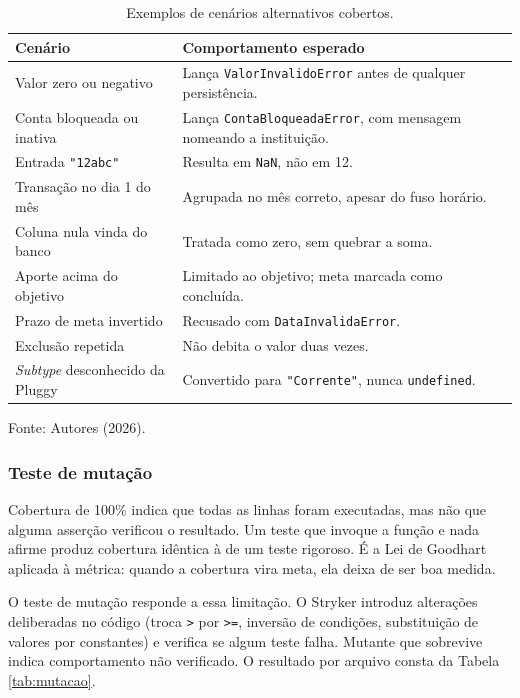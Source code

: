 \documentclass[12pt,a4paper]{article}
\begin{document}
\begin{table}[H]
\centering
\caption{Exemplos de cenários alternativos cobertos.}
\label{tab:alternativos}
\renewcommand{\arraystretch}{1.4}
\begin{tabularx}{\textwidth}{@{}>{\RaggedRight}p{4.6cm}>{\RaggedRight\arraybackslash}X@{}}
\toprule
\textbf{Cenário} & \textbf{Comportamento esperado} \\
\midrule
Valor zero ou negativo & Lança \texttt{ValorInvalidoError} antes de qualquer persistência. \\
Conta bloqueada ou inativa & Lança \texttt{ContaBloqueadaError}, com mensagem nomeando a instituição. \\
Entrada \texttt{"12abc"} & Resulta em \texttt{NaN}, não em 12. \\
Transação no dia 1 do mês & Agrupada no mês correto, apesar do fuso horário. \\
Coluna nula vinda do banco & Tratada como zero, sem quebrar a soma. \\
Aporte acima do objetivo & Limitado ao objetivo; meta marcada como concluída. \\
Prazo de meta invertido & Recusado com \texttt{DataInvalidaError}. \\
Exclusão repetida & Não debita o valor duas vezes. \\
\textit{Subtype} desconhecido da Pluggy & Convertido para \texttt{"Corrente"}, nunca \texttt{undefined}. \\
\bottomrule
\end{tabularx}
\vspace{0.3cm}

\noindent\footnotesize Fonte: Autores (2026).
\end{table}

\subsubsection{Teste de mutação}
\label{sec:mutacao}

Cobertura de 100\% indica que todas as linhas foram executadas, mas não que alguma asserção verificou o resultado. Um teste que invoque a função e nada afirme produz cobertura idêntica à de um teste rigoroso. É a Lei de Goodhart aplicada à métrica: quando a cobertura vira meta, ela deixa de ser boa medida.

O teste de mutação responde a essa limitação. O Stryker introduz alterações deliberadas no código (troca \texttt{>} por \texttt{>=}, inversão de condições, substituição de valores por constantes) e verifica se algum teste falha. Mutante que sobrevive indica comportamento não verificado. O resultado por arquivo consta da Tabela \ref{tab:mutacao}.
\end{document}
